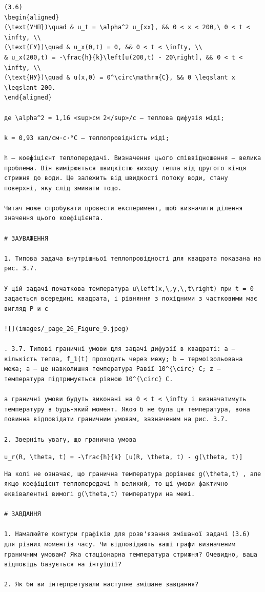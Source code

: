 \documentclass[
  ukrainian,
]{article}
\begin{document}
\begin{verbatim}
(3.6)
\begin{aligned}
(\text{УЧП})\quad & u_t = \alpha^2 u_{xx}, && 0 < x < 200,\ 0 < t < \infty, \\
(\text{ГУ})\quad & u_x(0,t) = 0, && 0 < t < \infty, \\
& u_x(200,t) = -\frac{h}{k}\left[u(200,t) - 20\right], && 0 < t < \infty, \\
(\text{НУ})\quad & u(x,0) = 0^\circ\mathrm{C}, && 0 \leqslant x \leqslant 200.
\end{aligned}

де \alpha^2 = 1,16 <sup>см 2</sup>/с — теплова дифузія міді;

k = 0,93 кал/см·с·°C — теплопровідність міді;

h — коефіцієнт теплопередачі. Визначення цього співвідношення — велика проблема. Він вимірюється швидкістю виходу тепла від другого кінця стрижня до води. Це залежить від швидкості потоку води, стану поверхні, яку слід змивати тощо.

Читач може спробувати провести експеримент, щоб визначити ділення значення цього коефіцієнта.

# ЗАУВАЖЕННЯ

1. Типова задача внутрішньої теплопровідності для квадрата показана на рис. 3.7.

У цій задачі початкова температура u\left(x,\,y,\,t\right) при t = 0 задається всередині квадрата, і рівняння з похідними з частковими має вигляд Р и с

![](images/_page_26_Figure_9.jpeg)

. 3.7. Типові граничні умови для задачі дифузії в квадраті: a — кількість тепла, f_1(t) проходить через межу; b — термоізольована межа; a — це навколишня температура Равії 10^{\circ} C; z — температура підтримується рівною 10^{\circ} C.

а граничні умови будуть виконані на 0 < t < \infty і визначатимуть температуру в будь-який момент. Якою б не була ця температура, вона повинна відповідати граничним умовам, зазначеним на рис. 3.7.

2. Зверніть увагу, що гранична умова
\end{verbatim}

\texttt{u\_r(R,\ \textbackslash{}theta,\ t)\ =\ -\textbackslash{}frac\{h\}\{k\}\ {[}u(R,\ \textbackslash{}theta,\ t)\ -\ g(\textbackslash{}theta,\ t){]}}

\begin{verbatim}
На колі не означає, що гранична температура дорівнює g(\theta,t) , але якщо коефіцієнт теплопередачі h великий, то ці умови фактично еквівалентні вимогі g(\theta,t) температури на межі.

# ЗАВДАННЯ

1. Намалюйте контури графіків для розв'язання змішаної задачі (3.6) для різних моментів часу. Чи відповідають ваші графи визначеним граничним умовам? Яка стаціонарна температура стрижня? Очевидно, ваша відповідь базується на інтуїції?

2. Як би ви інтерпретували наступне змішане завдання?
\end{verbatim}
\end{document}
